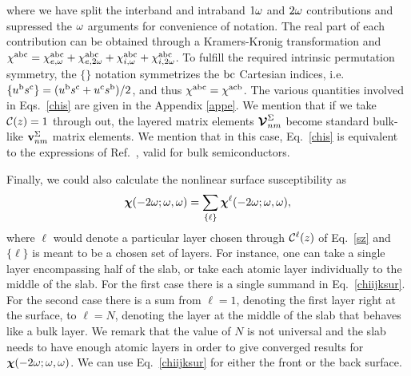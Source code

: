 \documentclass[floatfix,prb,aps,superscriptaddress,11pt,preprint,letterpaper]{revtex4}
\def\chon{red}
\begin{document}
where we have split the interband and intraband $1\omega$ and $2\omega$
contributions and supressed the $\omega$ arguments for 
convenience of notation.
The real part of each contribution can be obtained through
a Kramers-Kronig transformation\cite{nicolasPRB14} and
$\chi^{\mathrm{a}\mathrm{b}\mathrm{c}}=
\chi^{\mathrm{a}\mathrm{b}\mathrm{c}}_{e,\omega} 
+\chi^{\mathrm{a}\mathrm{b}\mathrm{c}}_{e,2\omega}
+\chi^{\mathrm{a}\mathrm{b}\mathrm{c}}_{i,\omega} 
+\chi^{\mathrm{a}\mathrm{b}\mathrm{c}}_{i,2\omega}
$.
To fulfill the required intrinsic permutation symmetry, %
the $\{\}$ notation symmetrizes the $\mathrm{b}\mathrm{c}$ Cartesian indices, i.e. 
$\{u^{\mathrm{b}}s^{\mathrm{c}}\}=(u^{\mathrm{b}}s^{\mathrm{c}}+u^{\mathrm{c}}s^{\mathrm{b}})/2$,
and thus
$\chi^{\mathrm{a}\mathrm{b}\mathrm{c}}=\chi^{\mathrm{a}\mathrm{c}\mathrm{b}}$.
The various quantities involved in Eqs.~\eqref{chis} are given in
the Appendix \ref{appe}. 
We mention that if we take ${\mathbf{\cal C}}(z)=1$ through out, the layered
matrix elements $\boldsymbol{\mathcal{\cal V}}^{\Sigma}_{nm}$ become standard bulk-like
$\mathbf{v}^{\Sigma}_{nm}$ matrix elements. We mention that in this
case, Eq.~\eqref{chis} is equivalent to the expressions of
Ref.~, valid for bulk semiconductors.
 
Finally, we could also calculate the nonlinear surface susceptibility as 
\begin{equation}\label{chiijksur}
\boldsymbol{\chi}(-2\omega;\omega,\omega)
= \sum_{\{\ell\}}\boldsymbol{\chi}^\ell(-2\omega;\omega,\omega),
\end{equation} 
where $\ell$ would denote a particular layer chosen through
${\mathbf{\cal C}}^\ell(z)$ of Eq.~\eqref{sz} and
$\{\ell\}$
is meant to be a chosen set of layers. For instance, 
one can take a single layer 
encompassing half of the slab, or take each 
atomic layer individually to the middle
of the slab. For the first case there is 
a single summand
in Eq.~\eqref{chiijksur}. For the second case
there is a sum from $\ell=1$, denoting the first layer 
right at the surface, to $\ell=N$, denoting the layer at the middle of the slab 
that behaves like a bulk layer.
We remark that the value of 
$N$ is not universal and
the slab needs to have enough atomic layers 
in order to give converged results for 
$\boldsymbol{\chi} (-2\omega;\omega,\omega)$. 
We can use Eq.~\eqref{chiijksur} for 
either the front or the back surface. 
\cite{mejiaRMF04}
\end{document}
